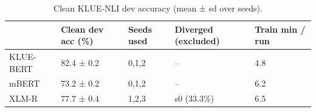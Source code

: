 \begin{table}
\caption{Clean KLUE-NLI dev accuracy (mean ± sd over seeds).}
\label{tab:table1_clean}
\begin{tabular}{lllll}
\toprule
 & Clean dev acc (\%) & Seeds used & Diverged (excluded) & Train min / run \\
\midrule
KLUE-BERT & 82.4 ± 0.2 & 0,1,2 & – & 4.8 \\
mBERT & 73.2 ± 0.2 & 0,1,2 & – & 6.2 \\
XLM-R & 77.7 ± 0.4 & 1,2,3 & s0 (33.3\%) & 6.5 \\
\bottomrule
\end{tabular}
\end{table}
